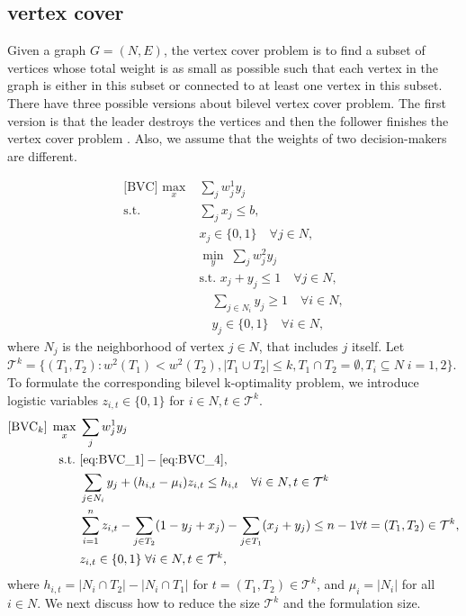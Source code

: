 \documentclass[11pt]{article}
\newcommand{\T}{\mathcal{T}}
\begin{document}
\subsection{vertex cover}
Given a graph $G = (N, E)$, the vertex cover problem is to find a subset of vertices whose total weight is as small as possible such that each vertex in the graph is either in this subset or connected to at least one vertex in this subset. There have three possible versions about bilevel vertex cover problem. The first version is that the leader destroys the vertices and then the follower finishes the vertex cover problem \cite{bazgan2011most}. Also, we assume that the weights of two decision-makers are different.

\begin{subequations}
	\begin{align}
	\text{[BVC]~}\max_x\; & \sum_j w_j^1 y_j \nonumber\\
	\text{s.t.~} & \sum_{j} x_j \leq b, \label{eq:BVC_1} \\
	& x_j \in \{0,1\} \quad \forall j\in N, \\
	& \min_y\;  \sum_j w_j^2 y_j \nonumber\\
	&\text{s.t.~}  x_j + y_j \leq 1 \quad \forall j\in N, \\
	& \quad \sum_{j\in N_i} y_j \geq 1 \quad \forall i\in N, \label{eq:BVC_3}\\
	& \quad y_j \in \{0, 1\} \quad \forall i \in N, \label{eq:BVC_4}
	\end{align}
\end{subequations}
where $N_j$ is the neighborhood of vertex $j\in N$, that includes $j$ itself. Let $\T^k = \{ (T_1, T_2): w^2(T_1) < w^2(T_2), |T_1\cup T_2|\leq k, T_1\cap T_2 = \emptyset, T_i \subseteq N\; i=1,2\}.$ To formulate the corresponding bilevel k-optimality problem, we introduce logistic variables $z_{i,t}\in \{0, 1\}$ for $i\in N, t\in \T^k$. 
\begin{subequations}
	\begin{align}
	[\text{BVC}_k]\;\max_x\; & \sum_j w_j^1 y_j \nonumber\\
	\text{s.t.~} & \eqref{eq:BVC_1} - \eqref{eq:BVC_4}, \nonumber\\
	& \sum_{j\in N_i} y_j + (h_{i, t} - \mu_i) z_{i, t} \leq h_{i, t} \quad \forall i\in N, t\in \T^k \\
	& \sum_{i=1}^n z_{i, t} - \sum_{j\in T_2} (1 - y_j + x_j) - \sum_{j\in T_1} (x_j + y_j) \leq n-1 \forall t = (T_1, T_2) \in \T^k, \label{eq:BVC_k_1}\\
	&  z_{i, t} \in \{0, 1\} \;\forall i\in N, t\in \T^k,
	\end{align}
\end{subequations}
where $h_{i, t} = |N_i \cap T_2| - |N_i \cap T_1|$ for $t = (T_1, T_2) \in \T^k$, and $\mu_i = |N_i|$ for all $i\in N$. We next discuss how to reduce the size $\T^k$ and the formulation  size.
\end{document}
